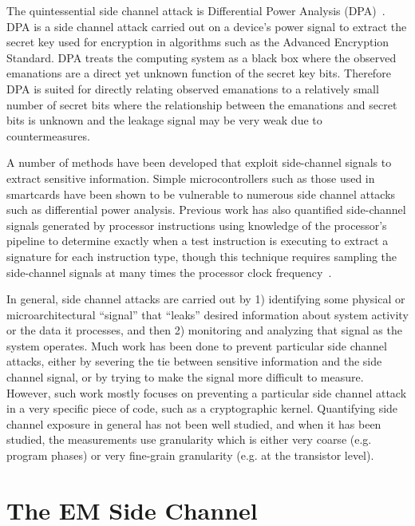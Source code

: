 The quintessential side channel attack is Differential Power Analysis (DPA)~\cite{Kocher99}. DPA is a side channel attack carried out on a device's power signal to extract the secret key used for encryption in algorithms such as the Advanced Encryption Standard. DPA treats the computing system as a black box where the observed emanations are a direct yet unknown function of the secret key bits. Therefore DPA is suited for directly relating observed emanations to a relatively small number of secret bits where the relationship between the emanations and secret bits is unknown and the leakage signal may be very weak due to countermeasures. 

A number of methods have been developed that exploit side-channel signals to extract sensitive information. Simple microcontrollers such as those used in smartcards have been shown to be vulnerable to numerous side channel attacks such as differential power analysis. Previous work has also quantified side-channel signals generated by processor instructions using knowledge of the processor's pipeline to determine exactly when a test instruction is executing to extract a signature for each instruction type, though this technique requires sampling the side-channel signals at many times the processor clock frequency~\cite{Goldack, eisenbarth2010, Quisquater2002}. 

In general, side channel attacks are carried out by 1) identifying some physical or microarchitectural ``signal'' that ``leaks'' desired information about system activity or the data it processes, and then 2) monitoring and analyzing that signal as the system operates. Much work has been done to prevent particular side channel attacks, either by severing the tie between sensitive information and the side channel signal, or by trying to make the signal more difficult to measure. However, such work mostly focuses on preventing a particular side channel attack in a very specific piece of code, such as a cryptographic kernel. Quantifying side channel exposure in general has not been well studied, and when it has been studied, the measurements use granularity which is either very coarse (e.g. program phases) or very fine-grain granularity (e.g. at the transistor level). 


\section{The EM Side Channel}

